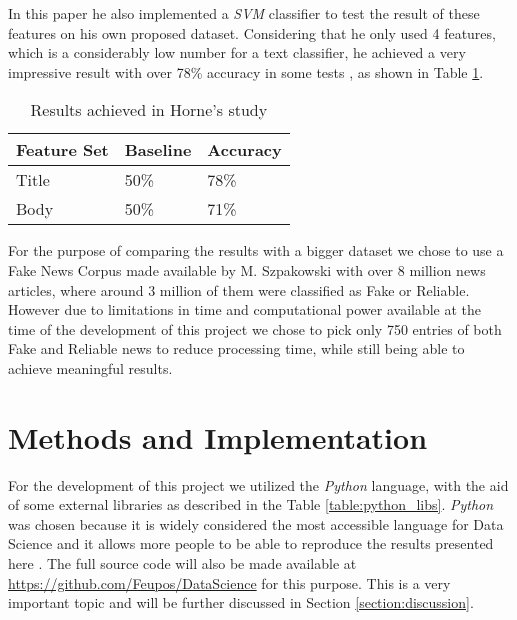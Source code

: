 \documentclass[conference]{IEEEtran}
\begin{document}
In this paper he also implemented a \textit{SVM} classifier to test the result of these features on his own
proposed dataset. Considering that he only used 4 features, which is a considerably low number for
a text classifier, he achieved a very impressive result with over 78\% accuracy in some tests , as
shown in Table \ref{table:horne_results}.

\begin{table}[htbp]
\caption{Results achieved in Horne's study}
\begin{center}
\begin{tabular}{ |l|l|l| }
\hline
Feature Set & Baseline & Accuracy \\
\hline
Title & 50\% & 78\% \\
\hline
Body & 50\% & 71\% \\
\hline
\end{tabular}
\label{table:horne_results}
\end{center}
\end{table}

For the purpose of comparing the results with a bigger dataset we chose to use a Fake News Corpus
made available by M. Szpakowski \cite{szpakowski_2019} with over 8 million news articles, where around
3 million of them were classified as Fake or Reliable. However due to limitations in time and
computational power available at the time of the development of this project we chose to pick
only 750 entries of both Fake and Reliable news to reduce processing time, while still being able
to achieve meaningful results.

\section{Methods and Implementation}

For the development of this project we utilized the \textit{Python} language, with the aid of some external
libraries as described in the Table \ref{table:python_libs}. \textit{Python} was chosen because it is widely
considered the most accessible language for Data Science and it allows more people to be able to reproduce
the results presented here \cite{cielen_meysman_mohamed_2016}\cite{richard_2018}. The full source
code will also be made available at \url{https://github.com/Feupos/DataScience} for this purpose.
This is a very important topic and will be further discussed in Section \ref{section:discussion}.
\end{document}
